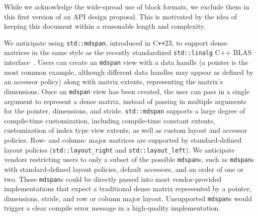 \documentclass[manuscript,review]{acmart}
\newcommand{\JimD}[1]{{\color{red}(Jim D) #1}}
\newcommand{\cppstd}[1]{C\texttt{++}#1\xspace}
\begin{document}
While we acknowledge the wide-spread use of block formats, we exclude them in this first version of an API design proposal. This is motivated by the idea of keeping this document within a reasonable length and complexity.



We anticipate using \texttt{std::mdspan}, introduced in \cppstd{23}, to support dense matrices in the same style as the recently standardized \texttt{std::linalg} C++ BLAS interface~\cite{cpplinalg:p1673r13}.  Users can create an \texttt{mdspan} view with a data handle (a pointer is the most common example, although different data handles may appear as defined by an accessor policy) along with matrix extents, representing the matrix's dimensions.  Once an \texttt{mdspan} view has been created, the user can pass in a single argument to represent a dense matrix, instead of passing in multiple arguments for the pointer, dimensions, and stride.  \texttt{std::mdspan} supports a large degree of compile-time customization, including compile-time constant extents, customization of index type view extents, as well as custom layout and accessor policies.  Row- and column- major matrices are supported by standard-defined layout policies (\texttt{std::layout\_right} and \texttt{std::layout\_left}).  We anticipate vendors restricting users to only a subset of the possible \texttt{mdspan}s, such as \texttt{mdspan}s with standard-defined layout policies, default accessors, and an order of one or two.  These \texttt{mdspan}s could be directly passed into most vendor-provided implementations that expect a traditional dense matrix represented by a pointer, dimensions, stride, and row or column major layout.  Unsupported \texttt{mdspan}s would trigger a clear compile error message in a high-quality implementation.



\end{document}

